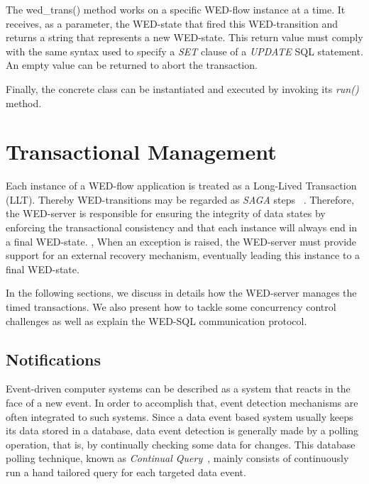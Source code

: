 \documentclass[12pt]{article}
\begin{document}
The wed\_trans() method works on a specific WED-flow instance at a time. It receives, as a parameter, the WED-state that  fired this WED-transition and returns a string that represents a new WED-state. This return value must comply with the same syntax used to specify a \emph{SET} clause of a \emph{UPDATE} SQL statement. An empty value can be returned to abort the transaction.

\par Finally, the concrete class can be instantiated and executed by invoking its \emph{run()} method.



\section{Transactional Management}
\label{sec:prot}

Each instance of a WED-flow application is  treated as a Long-Lived Transaction (LLT). Thereby WED-transitions may be regarded as \emph{SAGA} steps ~\cite{SGD87}. Therefore, the WED-server is responsible for ensuring the integrity of data states by enforcing the transactional consistency and that each instance will always end in a final WED-state. , When an exception is raised, the WED-server  must provide support for an external recovery mechanism, eventually leading this instance to a final WED-state. 

In the following sections, we discuss in details how the WED-server manages the timed transactions. We also present how to tackle some concurrency control challenges as well as explain the WED-SQL communication protocol. 

\subsection{Notifications}
\label{not}

Event-driven computer systems can be described as a system that reacts in the face of a new event. In order to  accomplish that, event detection mechanisms are often integrated to such systems. Since a data event based system usually keeps its data stored in a database, data event detection is generally made by a polling operation, that is, by continually checking some data for changes. This database polling technique, known as \emph{Continual Query}~\cite{CQ}, mainly consists of  continuously run a hand tailored query for each targeted data event.     
\end{document}
